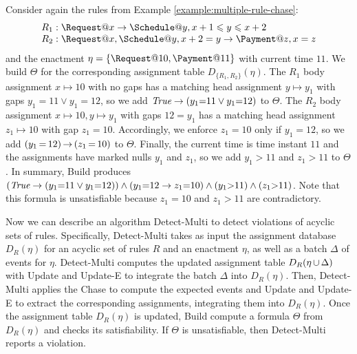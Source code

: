 \begin{examp}\label{example:multiple-rules-build}
  Consider again the rules from Example \ref{example:multiple-rule-chase}:
  \[
  \begin{array}{l}
    R_1:
    \Request@x \rightarrow
    \Schedule@y, x+1 \leq y \leq x+2
    \\
    R_2:
    \Request@x, \Schedule@y, x+2=y \rightarrow
    \Payment@z, x=z
  \end{array}
  \]
  and the enactment $\eta=\{\Request@10, \Payment@11\}$
  with current time $11$.
  We build $\Theta$ for the corresponding assignment table $D_{\{R_1,R_2\}}(\eta)$.
  The $R_1$ body assignment $x\mapsto 10$
  with no gaps
  has a matching head assignment 
  $y\mapsto y_1$ with gaps $y_1=11\lor y_1=12$,
  so we add $\mbox{\it True} \rightarrow (y_1{=}11\lor y_1{=}12)$
  to $\Theta$.
  The $R_2$ body assignment $x\mapsto 10, y\mapsto y_1$
  with gaps $12=y_1$
  has a matching head assignment
  $z_1\mapsto 10$ with gap $z_1=10$.
  Accordingly,
  we enforce $z_1=10$ only if $y_1=12$,
  so we add $(y_1\,{=}\,12)\,{\rightarrow}\, (z_1\,{=}\,10)$ to $\Theta$.
  Finally,
  the current time is time instant $11$
  and the assignments have marked nulls $y_1$ and $z_1$,
  so we add $y_1>11$ and $z_1>11$ to $\Theta$.
  In summary,
  {\sf Build} produces
  $(\mbox{\it True} \rightarrow (y_1{=}11\lor y_1{=}12))
  \land (y_1{=}12 \rightarrow z_1{=}10)
  \land (y_1{>}11) \land (z_1{>}11)$.
  Note that this formula is unsatisfiable
  because $z_1=10$ and $z_1>11$ are contradictory.
\end{examp}

\smallskip

Now we can describe an algorithm {\sf Detect-Multi} to
detect violations of acyclic sets of rules.
Specifically,
{\sf Detect-Multi} takes as input
the assignment database $D_{R}(\eta)$
for an acyclic set of rules $R$ and an enactment $\eta$,
as well as a batch $\Delta$ of events for $\eta$.
{\sf Detect-Multi} computes the updated assignment table $D_{R}(\eta\,{\cup}\,\Delta)$
with {\sf Update} and {\sf Update-E}
to integrate the batch $\Delta$ into $D_{R}(\eta)$.
Then,
{\sf Detect-Multi} applies 
the {\sf Chase} to compute the expected events and
{\sf Update} and {\sf Update-E} to extract the corresponding assignments,
integrating them into $D_{R}(\eta)$.
Once the assignment table $D_{R}(\eta)$ is updated,
{\sf Build} compute a formula $\Theta$ from $D_{R}(\eta)$
and checks its satisfiability.
If $\Theta$ is unsatisfiable,
then {\sf Detect-Multi} reports a violation.

